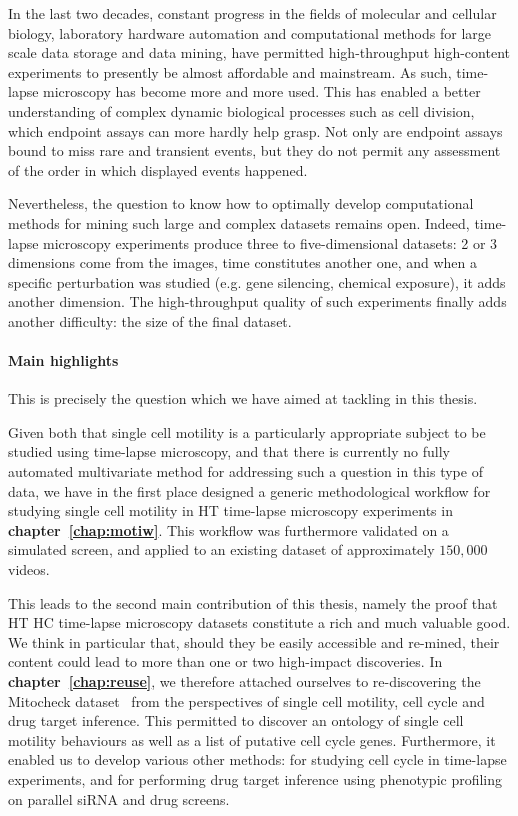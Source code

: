 \clearpage
In the last two decades, constant progress in the fields of molecular and cellular biology, laboratory hardware automation and computational methods for large scale data storage and data mining, have permitted high-throughput high-content experiments to presently be almost affordable and mainstream. As such, time-lapse microscopy has become more and more used. This has enabled a better understanding of complex dynamic biological processes such as cell division, which endpoint assays can more hardly help grasp. Not only are endpoint assays bound to miss rare and transient events, but they do not permit any assessment of the order in which displayed events happened.

Nevertheless, the question to know how to optimally develop computational methods for mining such large and complex datasets remains open. Indeed, time-lapse microscopy experiments produce three to five-dimensional datasets: 2 or 3 dimensions come from the images, time constitutes another one, and when a specific perturbation was studied (e.g. gene silencing, chemical exposure), it adds another dimension. The high-throughput quality of such experiments finally adds another difficulty: the size of the final dataset.

\paragraph*{Main highlights\\}
This is precisely the question which we have aimed at tackling in this thesis.

Given both that single cell motility is a particularly appropriate subject to be studied using time-lapse microscopy, and that there is currently no fully automated multivariate method for addressing such a question in this type of data, we have in the first place designed a generic methodological workflow for studying single cell motility in HT time-lapse microscopy experiments in \textbf{chapter~\ref{chap:motiw}}. This workflow was furthermore validated on a simulated screen, and applied to an existing dataset of approximately $150,000$ videos.

This leads to the second main contribution of this thesis, namely the proof that HT HC time-lapse microscopy datasets constitute a rich and much valuable good. We think in particular that, should they be easily accessible and re-mined, their content could lead to more than one or two high-impact discoveries. In \textbf{chapter~\ref{chap:reuse}}, we therefore attached ourselves to re-discovering the Mitocheck dataset~\cite{pmid20360735} from the perspectives of single cell motility, cell cycle and drug target inference. This permitted to discover an ontology of single cell motility behaviours as well as a list of putative cell cycle genes. Furthermore, it enabled us to develop various other methods: for studying cell cycle in time-lapse experiments, and for performing drug target inference using phenotypic profiling on parallel siRNA and drug screens.

